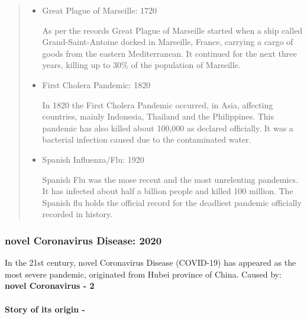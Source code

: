 \documentclass[11pt]{article}
\begin{document}
\begin{quote}
\begin{itemize}
\item
  Great Plague of Marseille: 1720

   As per the records Great Plague of Marseille started when a ship
  called Grand-Saint-Antoine docked in Marseille, France, carrying a
  cargo of goods from the eastern Mediterranean. It continued for the
  next three years, killing up to 30\% of the population of Marseille. 
\item
  First Cholera Pandemic: 1820

   In 1820 the First Cholera Pandemic occurred, in Asia, affecting
  countries, mainly Indonesia, Thailand and the Philippines. This
  pandemic has also killed about 100,000 as declared officially. It was
  a bacterial infection caused due to the contaminated water. 
\item
  Spanish Influenza/Flu: 1920

   Spanish Flu was the mose recent and the most unrelenting pandemics.
  It has infected about half a billion people and killed 100 million.
  The Spanish flu holds the official record for the deadliest pandemic
  officially recorded in history. 
\end{itemize}
\end{quote}

    \hypertarget{novel-coronavirus-disease-2020}{%
\subsubsection{novel Coronavirus Disease:
2020}\label{novel-coronavirus-disease-2020}}

 In the 21st century, novel Coronavirus Disease (COVID-19) has appeared
as the most severe pandemic, originated from Hubei province of China.
Caused by: \textbf{novel Coronavirus - 2} 

    \hypertarget{story-of-its-origin--}{%
\paragraph{Story of its origin -}\label{story-of-its-origin--}}
\end{document}
